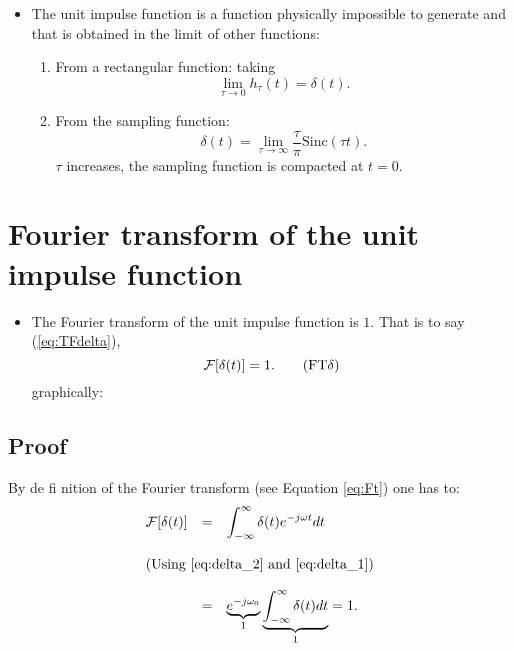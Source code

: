 \begin{itemize}
\item The unit impulse function is a function physically impossible to
  generate and that is obtained in the limit of other functions:
  \begin{enumerate}
  \item From a rectangular function:
    taking
    $$
    \lim_{\tau\rightarrow0}h_\tau(t) = \delta(t).
    $$
  \item From the sampling function:
    \begin{equation}
      \delta(t) =
      \lim_{\tau\rightarrow\infty}\frac{\tau}{\pi}\mathrm{Sinc}(\tau
      t).  \tag{delta\_sinc}
      \label{eq:delta_sinc}
    \end{equation}
    $\tau$ increases, the sampling function is compacted at $t=0$.
  \end{enumerate}
\end{itemize}

\section{Fourier transform of the unit impulse function}
\begin{itemize}
\item [] The Fourier transform of the unit impulse function is
  $1$. That is to say (\ref{eq:TFdelta}),
  \begin{equation}
    {\cal{F}}[\delta(t)]=1.
    \tag{FT$\delta$}
    \label{eq:TFdelta}
  \end{equation}
  graphically:
\end{itemize}
\subsection*{Proof}
By de fi nition of the Fourier transform (see Equation \ref{eq:Ft}) one has to:
\begin{equation*}
  \begin{array}{rcl}
    {\cal F}[\delta(t)] & = & \displaystyle\int_{-\infty}^\infty\delta(t)e^{-j\omega t}dt\\\\
    \multicolumn{3}{l}{\text{(Using \ref{eq:delta_2} and \ref{eq:delta_1})}}\\\\
    & = & \underbrace{e^{-j\omega_0}}_{1}\underbrace{\displaystyle\int_{-\infty}^\infty\delta(t)dt}_{1} = 1.
  \end{array}
\end{equation*}

